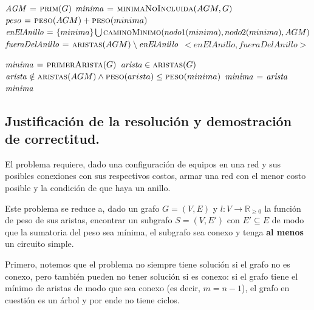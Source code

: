 \vspace*{0.3cm}


\begin{codebox}
\li $\id{AGM} \gets \proc{prim}(G)$
\li $\id{minima} \gets \proc{minimaNoIncluida}(AGM, G)$
\li $\id{peso} \gets \proc{peso}(AGM) + \proc{peso}(minima)$
\li $\id{enElAnillo} \gets \{minima\} \bigcup \proc{caminoMinimo}(nodo1(minima), nodo2(minima), AGM)$
\li $\id{fueraDelAnillo} \gets \proc{aristas}(AGM) \setminus \id{enElAnillo}$
\li \Return $< enElAnillo, fueraDelAnillo >$
\end{codebox}


\vspace*{0.3cm}


\begin{codebox}
\li $\id{minima} \gets \proc{primerArista}(G)$
\li \For $\id{arista} \in \proc{aristas}(G)$
      \Do
\li     \If $\id{arista} \notin \proc{aristas}(AGM) \land
            \proc{peso}(arista) \leq \proc{peso}(minima)$
            \Do
\li            $\id{minima} \gets \id{arista}$
            \End
      \End
\li \Return $\id{minima}$
\end{codebox}



\newpage
\subsection{Justificación de la resolución y demostración de correctitud.}

\vspace*{0.3cm}


El problema requiere, dado una configuración de equipos en una red y sus
posibles conexiones con sus respectivos costos, armar una red con el menor
costo posible y la condición de que haya un anillo.

Este problema se reduce a, dado un grafo $G = (V, E)$ y $l: V \to
\mathbb{R}_{\geq 0}$ la función de peso de sus aristas, encontrar un
subgrafo $S = (V, E')$ con $E' \subseteq E$ de modo que la sumatoria del
peso sea mínima, el subgrafo sea conexo y tenga \textbf{al menos} un circuito simple.

Primero, notemos que el problema no siempre tiene solución si el grafo no es 
conexo, pero también pueden no tener solución si es conexo: si el grafo tiene el 
mínimo de aristas de modo que sea conexo (es decir, $m = n - 1$), el grafo en 
cuestión es un árbol y por ende no tiene ciclos. 

